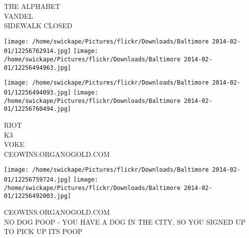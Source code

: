 \documentclass[10pt,letterpaper]{article}
\begin{document}
THE ALPHABET\\
VANDEL\\
SIDEWALK CLOSED
\pagebreak

\texttt{[image: /home/swickape/Pictures/flickr/Downloads/Baltimore 2014-02-01/12256762914.jpg]}
\texttt{[image: /home/swickape/Pictures/flickr/Downloads/Baltimore 2014-02-01/12256494963.jpg]}

\texttt{[image: /home/swickape/Pictures/flickr/Downloads/Baltimore 2014-02-01/12256494093.jpg]}
\texttt{[image: /home/swickape/Pictures/flickr/Downloads/Baltimore 2014-02-01/12256760494.jpg]}

RIOT\\
K3\\
VOKE\\
CEOWINS.ORGANOGOLD.COM
\pagebreak

\texttt{[image: /home/swickape/Pictures/flickr/Downloads/Baltimore 2014-02-01/12256759724.jpg]}
\texttt{[image: /home/swickape/Pictures/flickr/Downloads/Baltimore 2014-02-01/12256492003.jpg]}

CEOWINS.ORGANOGOLD.COM\\
NO DOG POOP {-} YOU HAVE A DOG IN THE CITY, SO YOU SIGNED UP TO PICK UP ITS POOP
\pagebreak
\end{document}
